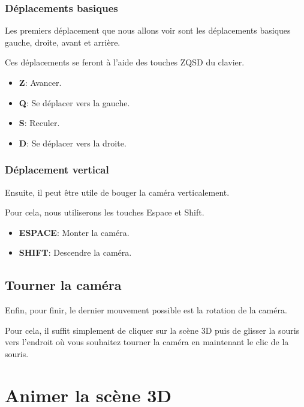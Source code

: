 \documentclass[11pt]{report}
\begin{document}
\subsection{Déplacements basiques}

\hypertarget{move}{Les premiers déplacement que nous allons voir sont les déplacements basiques gauche, droite, avant et arrière.} Ces déplacements se feront à l'aide des touches ZQSD du clavier.

\begin{itemize}
  \item \textbf{Z}: Avancer.
  \item \textbf{Q}: Se déplacer vers la gauche.
  \item \textbf{S}: Reculer.
  \item \textbf{D}: Se déplacer vers la droite.
\end{itemize}

\subsection{Déplacement vertical}

\hypertarget{moveV}{Ensuite, il peut être utile de bouger la caméra verticalement.} Pour cela, nous utiliserons les touches Espace et Shift.

\begin{itemize}
  \item \textbf{ESPACE}: Monter la caméra.
  \item \textbf{SHIFT}: Descendre la caméra.
\end{itemize}

\section{Tourner la caméra}

\hypertarget{rotate}{Enfin, pour finir, le dernier mouvement possible est la rotation de la caméra.} Pour cela, il suffit simplement de cliquer sur la scène 3D puis de glisser la souris vers l'endroit où vous souhaitez tourner la caméra en maintenant le clic de la souris.


\chapter{Animer la scène 3D}
\end{document}
